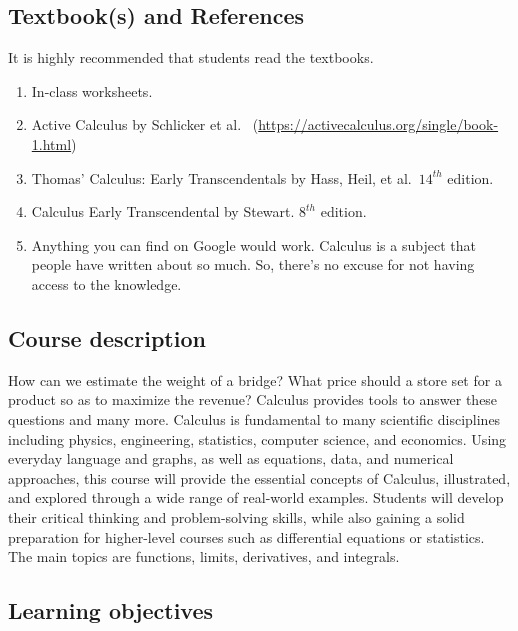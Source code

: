 \documentclass[
]{article}
\begin{document}
\subsection*{Textbook(s) and References}\label{textbooks-and-references}

It is highly recommended that students read the textbooks.

\begin{enumerate}
\def\labelenumi{\arabic{enumi}.}
\item
  In-class worksheets.
\item
  Active Calculus by Schlicker et al.~
  (\url{https://activecalculus.org/single/book-1.html})
\item
  Thomas' Calculus: Early Transcendentals by Hass, Heil, et al.~\(14^{th}\) edition.
\item
  Calculus Early Transcendental by Stewart. \(8^{th}\) edition.
\item
  Anything you can find on Google would work.
  Calculus is a subject that people have written about
  so much. So, there's no excuse for not having access
  to the knowledge.
\end{enumerate}

\subsection*{Course description}\label{course-description}

How can we estimate the weight of a bridge? What price should a store set for a product so as to maximize the revenue? Calculus provides tools to answer these questions and many more. Calculus is fundamental to many scientific disciplines including physics, engineering, statistics, computer science, and economics. Using everyday language and graphs, as well as equations, data, and numerical approaches, this course will provide the essential concepts of Calculus, illustrated, and explored through a wide range of real-world examples. Students will develop their critical thinking and problem-solving skills, while also gaining a solid preparation for higher-level courses such as differential equations or statistics. The main topics are functions, limits, derivatives, and integrals.

\subsection*{Learning objectives}\label{learning-objectives}
\end{document}
